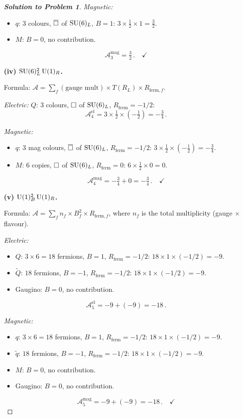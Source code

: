 \documentclass[11pt,a4paper]{article}
\begin{document}
\begin{proof}[\textbf{Solution to Problem 1}]
\textit{Magnetic:}
\begin{itemize}
  \item $q$: $3$ colours, $\overline{\square}$ of $\mathrm{SU}(6)_L$, $B = 1$:
    $3 \times \frac{1}{2} \times 1 = \frac{3}{2}$.
  \item $M$: $B = 0$, no contribution.
\end{itemize}
\[
  \mathcal{A}^{\mathrm{mag}}_3 = \boxed{\tfrac{3}{2}}\,.
  \quad\checkmark
\]

\medskip

\textbf{(iv) $\mathrm{SU}(6)_L^2\,\mathrm{U}(1)_R$.}

Formula: $\mathcal{A} = \sum_f (\text{gauge mult}) \times T(R_L)
\times R_{\mathrm{ferm},f}$.

\textit{Electric:} $Q$: $3$ colours, $\square$ of $\mathrm{SU}(6)_L$,
$R_{\mathrm{ferm}} = -1/2$:
\[
  \mathcal{A}^{\mathrm{el}}_4 = 3 \times \tfrac{1}{2} \times (-\tfrac{1}{2})
  = \boxed{-\tfrac{3}{4}}\,.
\]

\textit{Magnetic:}
\begin{itemize}
  \item $q$: $3$ mag colours, $\overline{\square}$ of $\mathrm{SU}(6)_L$,
    $R_{\mathrm{ferm}} = -1/2$:
    $3 \times \frac{1}{2} \times (-\frac{1}{2}) = -\frac{3}{4}$.
  \item $M$: $6$ copies, $\square$ of $\mathrm{SU}(6)_L$,
    $R_{\mathrm{ferm}} = 0$:
    $6 \times \frac{1}{2} \times 0 = 0$.
\end{itemize}
\[
  \mathcal{A}^{\mathrm{mag}}_4 = -\tfrac{3}{4} + 0
  = \boxed{-\tfrac{3}{4}}\,.
  \quad\checkmark
\]

\medskip

\textbf{(v) $\mathrm{U}(1)_B^2\,\mathrm{U}(1)_R$.}

Formula: $\mathcal{A} = \sum_f n_f \times B_f^2 \times R_{\mathrm{ferm},f}$,
where $n_f$ is the total multiplicity (gauge $\times$ flavour).

\textit{Electric:}
\begin{itemize}
  \item $Q$: $3 \times 6 = 18$ fermions, $B = 1$, $R_{\mathrm{ferm}} = -1/2$:
    $18 \times 1 \times (-1/2) = -9$.
  \item $\widetilde{Q}$: $18$ fermions, $B = -1$,
    $R_{\mathrm{ferm}} = -1/2$:
    $18 \times 1 \times (-1/2) = -9$.
  \item Gaugino: $B = 0$, no contribution.
\end{itemize}
\[
  \mathcal{A}^{\mathrm{el}}_5 = -9 + (-9) = \boxed{-18}\,.
\]

\textit{Magnetic:}
\begin{itemize}
  \item $q$: $3 \times 6 = 18$ fermions, $B = 1$, $R_{\mathrm{ferm}} = -1/2$:
    $18 \times 1 \times (-1/2) = -9$.
  \item $\widetilde{q}$: $18$ fermions, $B = -1$,
    $R_{\mathrm{ferm}} = -1/2$:
    $18 \times 1 \times (-1/2) = -9$.
  \item $M$: $B = 0$, no contribution.
  \item Gaugino: $B = 0$, no contribution.
\end{itemize}
\[
  \mathcal{A}^{\mathrm{mag}}_5 = -9 + (-9) = \boxed{-18}\,.
  \quad\checkmark
\]


\end{proof}
\end{document}
